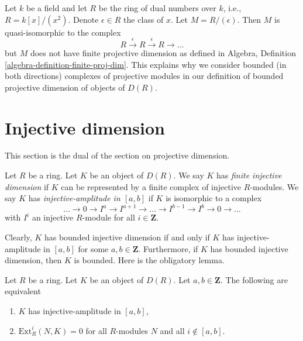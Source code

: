 \begin{example}
\label{example-ext-not-bounded}
Let $k$ be a field and let $R$ be the ring of dual numbers
over $k$, i.e., $R = k[x]/(x^2)$. Denote $\epsilon \in R$ the
class of $x$. Let $M = R/(\epsilon)$. Then $M$ is quasi-isomorphic
to the complex
$$
R \xrightarrow{\epsilon} R \xrightarrow{\epsilon} R \to \ldots
$$
but $M$ does not have finite projective dimension as defined in
Algebra, Definition \ref{algebra-definition-finite-proj-dim}.
This explains why we consider bounded (in both directions) complexes
of projective modules in our definition of bounded projective dimension
of objects of $D(R)$.
\end{example}






\section{Injective dimension}
\label{section-injective-dimension}

\noindent
This section is the dual of the section on projective dimension.

\begin{definition}
\label{definition-injective-dimension}
Let $R$ be a ring. Let $K$ be an object of $D(R)$.
We say $K$ has {\it finite injective dimension} if $K$ can be
represented by a finite complex of injective $R$-modules.
We say $K$ has {\it injective-amplitude in $[a, b]$}
if $K$ is isomorphic to a complex
$$
\ldots \to 0 \to I^a \to I^{a + 1} \to \ldots \to
I^{b - 1} \to I^b \to 0 \to \ldots
$$
with $I^i$ an injective $R$-module for all $i \in \mathbf{Z}$.
\end{definition}

\noindent
Clearly, $K$ has bounded injective dimension if and only if $K$
has injective-amplitude in $[a, b]$ for some $a, b \in \mathbf{Z}$.
Furthermore, if $K$ has bounded injective dimension, then $K$
is bounded. Here is the obligatory lemma.

\begin{lemma}
\label{lemma-injective-amplitude}
Let $R$ be a ring. Let $K$ be an object of $D(R)$. Let $a, b \in \mathbf{Z}$.
The following are equivalent
\begin{enumerate}
\item $K$ has injective-amplitude in $[a, b]$,
\item $\text{Ext}^i_R(N, K) = 0$ for all $R$-modules $N$ and all
$i \not \in [a, b]$.
\end{enumerate}
\end{lemma}


